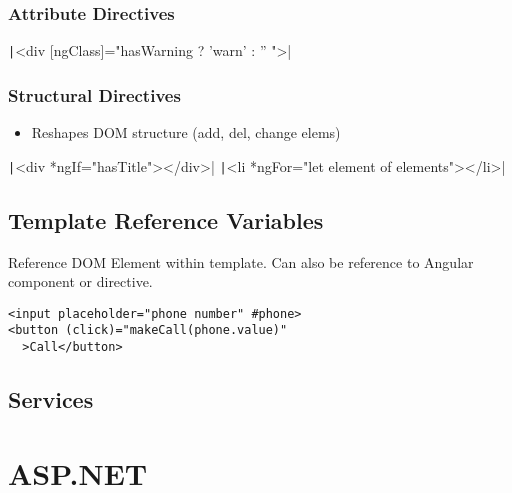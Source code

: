 \begin{multicols*}{4}
\subsubsection{Attribute Directives}
\texttt|<div [ngClass]="hasWarning ? 'warn' : '' ">|
\subsubsection{Structural Directives}
\begin{itemize}
    \item Reshapes DOM structure (add, del, change elems)
\end{itemize}
\texttt|<div *ngIf="hasTitle"></div>|
\texttt|<li *ngFor="let element of elements"></li>|


\subsection{Template Reference Variables}
Reference DOM Element within template. Can also be reference to Angular component or directive.
\begin{verbatim}
<input placeholder="phone number" #phone>
<button (click)="makeCall(phone.value)"
  >Call</button>
\end{verbatim}

\subsection{Services}




\section{ASP.NET}

\end{multicols*}
